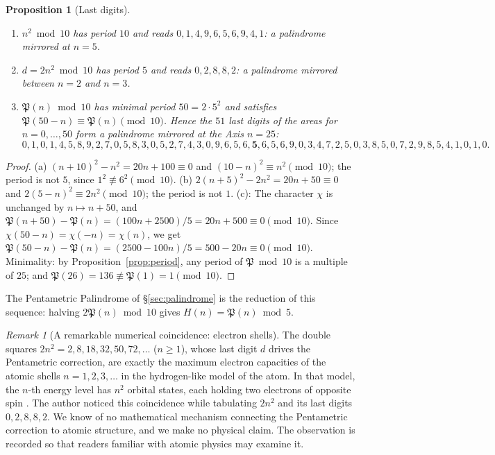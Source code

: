 \documentclass[11pt,a4paper]{article}
\newcommand{\Pent}{\mathfrak{P}}                      %
\theoremstyle{plain}
\newtheorem{proposition}[theorem]{Proposition}
\theoremstyle{definition}
\theoremstyle{remark}
\newtheorem{remark}[theorem]{Remark}
\begin{document}
\begin{proposition}[Last digits]\label{prop:lastdigits}
\leavevmode
\begin{enumerate}[label=(\alph*),itemsep=2pt]
  \item $n^{2}\bmod10$ has period $10$ and reads $0,1,4,9,6,5,6,9,4,1$: a palindrome mirrored at $n=5$.
  \item $d=2n^{2}\bmod10$ has period $5$ and reads $0,2,8,8,2$: a palindrome mirrored between $n=2$ and $n=3$.
  \item $\Pent(n)\bmod10$ has minimal period $50=2\cdot5^{2}$ and satisfies $\Pent(50-n)\equiv\Pent(n)\pmod{10}$. Hence the $51$ last digits of the areas for $n=0,\dots,50$ form a palindrome mirrored at the Axis $n=25$:
  \[
    0,1,0,1,4,5,8,9,2,7,0,5,8,3,0,5,2,7,4,3,0,9,6,5,6,\mathbf{5},6,5,6,9,0,3,4,7,2,5,0,3,8,5,0,7,2,9,8,5,4,1,0,1,0.
  \]
\end{enumerate}
\end{proposition}

\begin{proof}
(a) $(n+10)^{2}-n^{2}=20n+100\equiv0$ and $(10-n)^{2}\equiv n^{2}\pmod{10}$; the period is not $5$, since $1^{2}\not\equiv6^{2}\pmod{10}$. (b) $2(n+5)^{2}-2n^{2}=20n+50\equiv0$ and $2(5-n)^{2}\equiv2n^{2}\pmod{10}$; the period is not $1$.
(c): The character $\chi$ is unchanged by $n\mapsto n+50$, and $\Pent(n+50)-\Pent(n)=(100n+2500)/5=20n+500\equiv0\pmod{10}$. Since $\chi(50-n)=\chi(-n)=\chi(n)$, we get $\Pent(50-n)-\Pent(n)=(2500-100n)/5=500-20n\equiv0\pmod{10}$. Minimality: by Proposition~\ref{prop:period}, any period of $\Pent\bmod10$ is a multiple of $25$; and $\Pent(26)=136\not\equiv\Pent(1)=1\pmod{10}$.
\end{proof}

\noindent The Pentametric Palindrome of §\ref{sec:palindrome} is the reduction of this sequence: halving $2\Pent(n)\bmod10$ gives $H(n)=\Pent(n)\bmod5$.

\begin{remark}[A remarkable numerical coincidence: electron shells]\label{rem:shells}
The double squares $2n^{2}=2,8,18,32,50,72,\dots$ ($n\ge1$), whose last digit $d$ drives the Pentametric correction, are exactly the maximum electron capacities of the atomic shells $n=1,2,3,\dots$ in the hydrogen-like model of the atom. In that model, the $n$-th energy level has $n^{2}$ orbital states, each holding two electrons of opposite spin \cite{Griffiths2018}. The author noticed this coincidence while tabulating $2n^{2}$ and its last digits $0,2,8,8,2$. We know of no mathematical mechanism connecting the Pentametric correction to atomic structure, and we make no physical claim. The observation is recorded so that readers familiar with atomic physics may examine it.
\end{remark}
\end{document}
